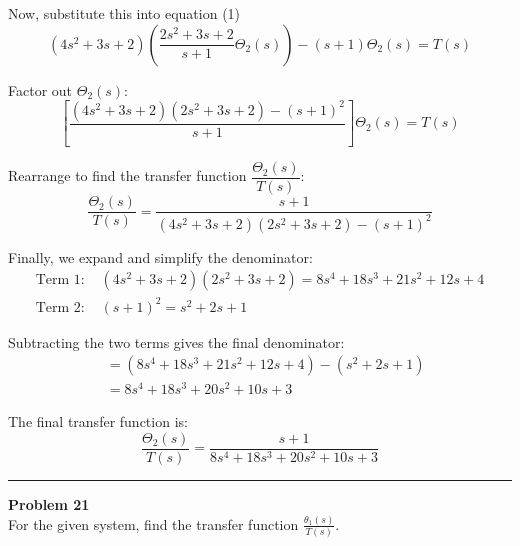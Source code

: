 \documentclass[11pt]{article}
\begin{document}
Now, substitute this into equation (1)
\[
(4s^2 + 3s + 2) \left( \frac{2s^2 + 3s + 2}{s + 1} \Theta_2(s) \right) - (s + 1)\Theta_2(s) = T(s)
\]

Factor out $\Theta_2(s)$:
\[
\left[ \frac{(4s^2 + 3s + 2)(2s^2 + 3s + 2) - (s + 1)^2}{s + 1} \right] \Theta_2(s) = T(s)
\]

Rearrange to find the transfer function $\dfrac{\Theta_2(s)}{T(s)}$:
\[
\frac{\Theta_2(s)}{T(s)} = \frac{s + 1}{(4s^2 + 3s + 2)(2s^2 + 3s + 2) - (s + 1)^2}
\]

Finally, we expand and simplify the denominator:
\begin{align*}
    \text{Term 1: } & (4s^2 + 3s + 2)(2s^2 + 3s + 2) = 8s^4 + 18s^3 + 21s^2 + 12s + 4 \\
    \text{Term 2: } & (s + 1)^2 = s^2 + 2s + 1
\end{align*}

Subtracting the two terms gives the final denominator:
\begin{align*}
&= (8s^4 + 18s^3 + 21s^2 + 12s + 4) - (s^2 + 2s + 1) \\
&= 8s^4 + 18s^3 + 20s^2 + 10s + 3
\end{align*}

The final transfer function is:
\[
\boxed{\frac{\Theta_2(s)}{T(s)} = \frac{s + 1}{8s^4 + 18s^3 + 20s^2 + 10s + 3}}
\]
\newpage
  \setcounter{page}{40}  
\noindent\rule{\textwidth}{1pt}
\noindent\textbf{Problem 21} \hfill 
\\ For the given system, find the transfer function $\frac{\theta_1(s)}{T(s)}$.
\end{document}
